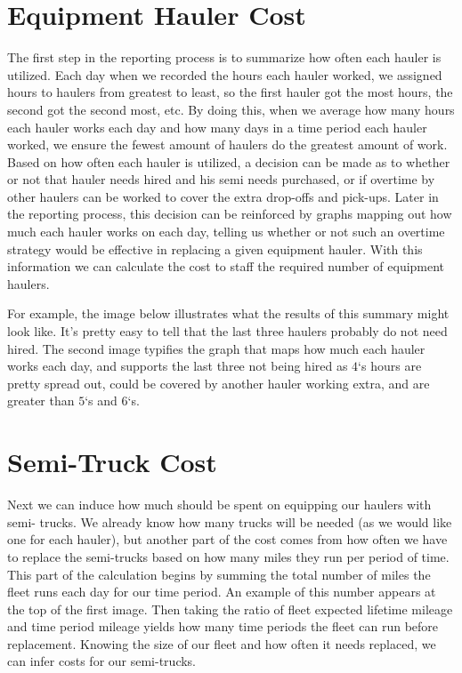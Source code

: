 \documentclass[letterpaper,10pt,english]{sphinxmanual}
\begin{document}
\section{Equipment Hauler Cost}
\label{\detokenize{reporting:equipment-hauler-cost}}
The first step in the reporting process is to summarize how often each hauler
is utilized. Each day when we recorded the hours each hauler worked, we
assigned hours to haulers from greatest to least, so the first hauler got the
most hours, the second got the second most, etc. By doing this, when we
average how many hours each hauler works each day and how many days in a time
period each hauler worked, we ensure the fewest amount of haulers do the greatest
amount of work. Based on how often each hauler is utilized, a decision can be
made as to whether or not that hauler needs hired and his semi needs purchased,
or if overtime by other haulers can be worked to cover the extra drop-offs
and pick-ups. Later in the reporting process, this decision can be reinforced
by graphs mapping out how much each hauler works on each day, telling us
whether or not such an overtime strategy would be effective in replacing a
given equipment hauler. With this information we can calculate the cost to
staff the required number of equipment haulers.

For example, the image below illustrates what the results of this summary
might look like. It's pretty easy to tell that the last three haulers
probably do not need hired. The second image typifies the graph that maps
how much each hauler works each day, and supports the last three not being
hired as \(4\)`s hours are pretty spread out, could be covered by another
hauler working extra, and are greater than \(5\)`s and \(6\)`s.

\noindent{}

\noindent{}


\section{Semi-Truck Cost}
\label{\detokenize{reporting:semi-truck-cost}}
Next we can induce how much should be spent on equipping our haulers with semi-
trucks. We already know how many trucks will be needed (as we would like one
for each hauler), but another part of the cost comes from how often we have
to replace the semi-trucks based on how many miles they run per period of
time. This part of the calculation begins by summing the total number
of miles the fleet runs each day for our time period. An example of this
number appears at the top of the first image. Then taking the ratio of fleet
expected lifetime mileage and time period mileage yields how many time periods
the fleet can run before replacement. Knowing the size of our fleet and how
often it needs replaced, we can infer costs for our semi-trucks.
\end{document}
